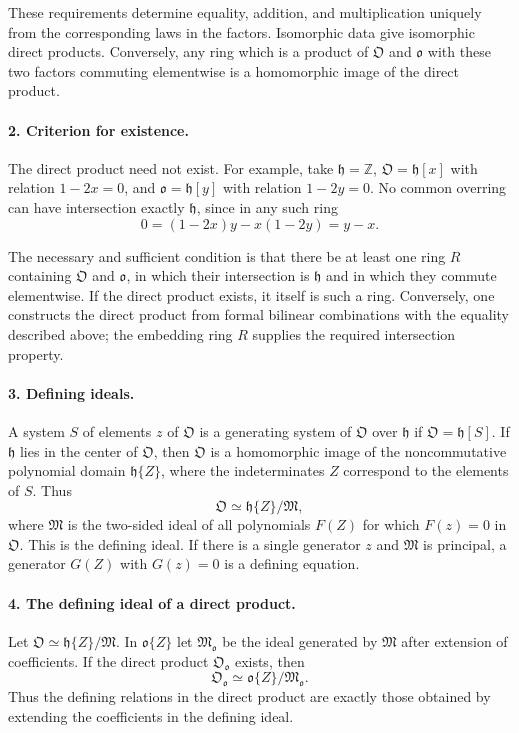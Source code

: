 \documentclass[11pt]{article}
\begin{document}
These requirements determine equality, addition, and multiplication uniquely from the corresponding laws in the factors. Isomorphic data give isomorphic direct products. Conversely, any ring which is a product of $\mathfrak O$ and $\mathfrak o$ with these two factors commuting elementwise is a homomorphic image of the direct product.

\paragraph{2. Criterion for existence.}
The direct product need not exist. For example, take $\mathfrak h=\mathbb Z$, $\mathfrak O=\mathfrak h[x]$ with relation $1-2x=0$, and $\mathfrak o=\mathfrak h[y]$ with relation $1-2y=0$. No common overring can have intersection exactly $\mathfrak h$, since in any such ring
\[
        0=(1-2x)y-x(1-2y)=y-x.
\]

The necessary and sufficient condition is that there be at least one ring $R$ containing $\mathfrak O$ and $\mathfrak o$, in which their intersection is $\mathfrak h$ and in which they commute elementwise. If the direct product exists, it itself is such a ring. Conversely, one constructs the direct product from formal bilinear combinations with the equality described above; the embedding ring $R$ supplies the required intersection property.

\paragraph{3. Defining ideals.}
A system $S$ of elements $z$ of $\mathfrak O$ is a generating system of $\mathfrak O$ over $\mathfrak h$ if $\mathfrak O=\mathfrak h[S]$. If $\mathfrak h$ lies in the center of $\mathfrak O$, then $\mathfrak O$ is a homomorphic image of the noncommutative polynomial domain $\mathfrak h\{Z\}$, where the indeterminates $Z$ correspond to the elements of $S$. Thus
\[
        \mathfrak O\simeq \mathfrak h\{Z\}/\mathfrak M,
\]
where $\mathfrak M$ is the two-sided ideal of all polynomials $F(Z)$ for which $F(z)=0$ in $\mathfrak O$. This is the defining ideal. If there is a single generator $z$ and $\mathfrak M$ is principal, a generator $G(Z)$ with $G(z)=0$ is a defining equation.

\paragraph{4. The defining ideal of a direct product.}
Let $\mathfrak O\simeq\mathfrak h\{Z\}/\mathfrak M$. In $\mathfrak o\{Z\}$ let $\mathfrak M_{\mathfrak o}$ be the ideal generated by $\mathfrak M$ after extension of coefficients. If the direct product $\mathfrak O_{\mathfrak o}$ exists, then
\[
        \mathfrak O_{\mathfrak o}\simeq \mathfrak o\{Z\}/\mathfrak M_{\mathfrak o}.
\]
Thus the defining relations in the direct product are exactly those obtained by extending the coefficients in the defining ideal.
\end{document}
